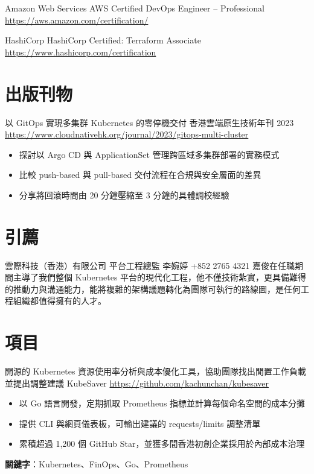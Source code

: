 \documentclass[a4paper, serif, 10pt]{moderncv}
\begin{document}
        {Amazon Web Services}
        {AWS Certified DevOps Engineer – Professional}
        {\url{https://aws.amazon.com/certification/}}
        {}
        {}

        {HashiCorp}
        {HashiCorp Certified: Terraform Associate}
        {\url{https://www.hashicorp.com/certification}}
        {}
        {}
\section{出版刊物}

        {以 GitOps 實現多集群 Kubernetes 的零停機交付}
        {香港雲端原生技術年刊 2023}
        {\url{https://www.cloudnativehk.org/journal/2023/gitops-multi-cluster}}
        {}
        {\begin{itemize}
\item 探討以 Argo CD 與 ApplicationSet 管理跨區域多集群部署的實務模式
\item 比較 push-based 與 pull-based 交付流程在合規與安全層面的差異
\item 分享將回滾時間由 20 分鐘壓縮至 3 分鐘的具體調校經驗
\end{itemize}}
\section{引薦}

        {雲際科技（香港）有限公司 平台工程總監}
        {李婉婷}
        {+852 2765 4321}
        {}
        {嘉俊在任職期間主導了我們整個 Kubernetes 平台的現代化工程，他不僅技術紮實，更具備難得的推動力與溝通能力，能將複雜的架構議題轉化為團隊可執行的路線圖，是任何工程組織都值得擁有的人才。}
\section{項目}

        {開源的 Kubernetes 資源使用率分析與成本優化工具，協助團隊找出閒置工作負載並提出調整建議}
        {KubeSaver}
        {\url{https://github.com/kachunchan/kubesaver}}
        {}
        {\begin{itemize}
\item 以 Go 語言開發，定期抓取 Prometheus 指標並計算每個命名空間的成本分攤
\item 提供 CLI 與網頁儀表板，可輸出建議的 requests/limits 調整清單
\item 累積超過 1,200 個 GitHub Star，並獲多間香港初創企業採用於內部成本治理
\end{itemize}
\textbf{關鍵字}：Kubernetes、FinOps、Go、Prometheus}
\end{document}
